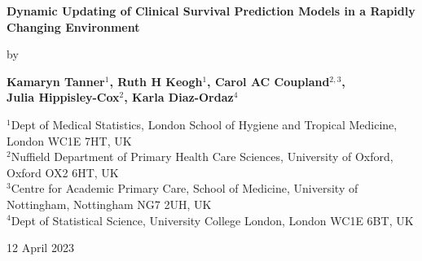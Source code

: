 \begin{titlepage}
   \begin{center}
       \vspace*{1cm}
\large
       \textbf{Dynamic Updating of Clinical Survival Prediction Models in a Rapidly Changing Environment}
       \vspace{0.5cm}

by        
            
       
\normalsize
       \textbf{Kamaryn Tanner$^{1}$,
       		Ruth H Keogh$^{1}$,
       		Carol AC Coupland$^{2,3}$,\\
       		Julia Hippisley-Cox$^{2}$,
       		Karla Diaz-Ordaz$^{4}$ \\}

            
            
       \vspace{0.8cm}
     
\small
            
	$^{1}$Dept of Medical Statistics, London School of Hygiene and Tropical Medicine, London WC1E 7HT, UK \\

	$^{2}$Nuffield Department of Primary Health Care Sciences, University of Oxford, Oxford OX2 6HT, UK\\

	$^{3}$Centre for Academic Primary Care, School of Medicine, University of Nottingham, Nottingham NG7 2UH, UK\\

	$^{4}$Dept of Statistical Science, University College London, London WC1E 6BT, UK
	
	
	\vspace{1.2cm}
	
	12 April 2023
            
   \end{center}
\end{titlepage}
